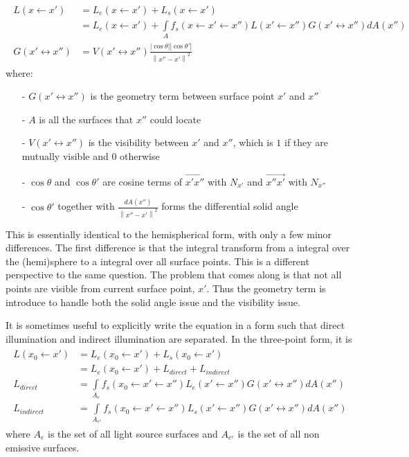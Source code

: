 \documentclass[]{book}
\begin{document}
\begin{gather}
\label{eq:renderEquation:threePoint}
\begin{aligned}
	L(x \leftarrow x') &= L_{e}(x \leftarrow x') + L_{s}(x \leftarrow x') \\ &= L_{e}(x \leftarrow x') + \int\limits_{A} f_{s}(x \leftarrow x' \leftarrow x'') L(x' \leftarrow x'') G(x' \leftrightarrow x'') dA(x'') \\
	G(x' \leftrightarrow x'') &= V(x' \leftrightarrow x'') \frac{\left| \cos\theta \right| \left| \cos{\theta}'\right|}{{\left\| x'' - x' \right\|}^2}
\end{aligned}
\end{gather}
where:
\begin{itemize}
	\item[-] $G(x' \leftrightarrow x'')$ is the geometry term between surface point $x'$ and $x''$
	\item[-] $A$ is all the surfaces that $x''$ could locate
	\item[-] $V(x' \leftrightarrow x'')$ is the visibility between $x'$ and $x''$, which is $1$ if they are mutually visible and $0$ otherwise
	\item[-] $\cos\theta$ and $\cos{\theta}'$ are cosine terms of $\vec{x'x''}$ with $N_{x'}$ and $\vec{x''x'}$ with $N_{x''}$
	\item[-] $\cos{\theta}'$ together with $\frac{dA(x'')}{{\left\| x'' - x' \right\|}^2}$ forms the differential solid angle
\end{itemize}

This is essentially identical to the hemispherical form, with only a few minor differences.
The first difference is that the integral transform from a integral over the (hemi)sphere to a integral over all surface points.
This is a different perspective to the same question.
The problem that comes along is that not all points are visible from current surface point, $x'$.
Thus the geometry term is introduce to handle both the solid angle issue and the visibility issue.

It is sometimes useful to explicitly write the equation in a form such that direct illumination and indirect illumination are separated.
In the three-point form, it is
\begin{gather}
\label{eq:renderEquation:dirIndir}
\begin{aligned}
	L(x_0 \leftarrow x') &= L_{e}(x_0 \leftarrow x') + L_{s}(x_0 \leftarrow x') \\ & = L_{e}(x_0 \leftarrow x') + L_{direct} + L_{indirect} \\
	L_{direct} &= \int\limits_{A_{e}} f_{s}(x_0 \leftarrow x' \leftarrow x'') L_{e}(x' \leftarrow x'') G(x' \leftrightarrow x'') dA(x'') \\
	L_{indirect} &= \int\limits_{A_{e^c}} f_{s}(x_0 \leftarrow x' \leftarrow x'') L_{s}(x' \leftarrow x'') G(x' \leftrightarrow x'') dA(x'')
\end{aligned}
\end{gather}
where $A_{e}$ is the set of all light source surfaces and $A_{e^c}$ is the set of all non emissive surfaces.
\end{document}
